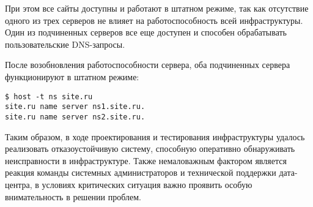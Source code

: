 При этом все сайты доступны и работают в штатном режиме, так как отсутствие одного из трех серверов не влияет на работоспособность всей инфраструктуры.
Один из подчиненных серверов все еще доступен и способен обрабатывать пользовательские DNS-запросы.

После возобновления работоспособности сервера, оба подчиненных сервера функционируют в штатном режиме:
\begin{lstlisting}
$ host -t ns site.ru
site.ru name server ns1.site.ru.
site.ru name server ns2.site.ru.
\end{lstlisting}

Таким образом, в ходе проектирования и тестирования инфраструктуры удалось реализовать отказоустойчивую систему, способную оперативно обнаруживать неисправности в инфраструктуре.
Также немаловажным фактором является реакция команды системных администраторов и технической поддержки дата-центра, в условиях критических ситуация важно проявить особую внимательность в решении проблем.

\clearpage
